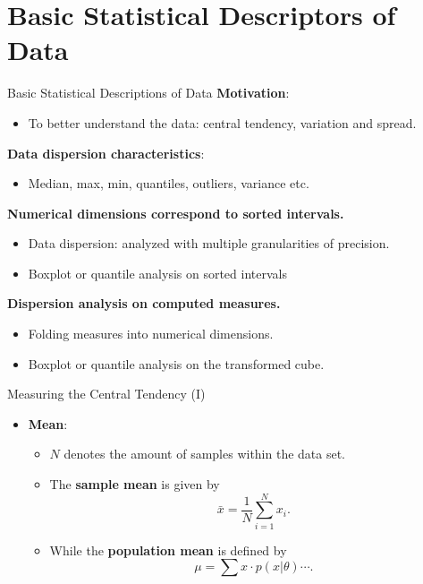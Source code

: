 \section{Basic Statistical Descriptors of Data}

\begin{frame}{Basic Statistical Descriptions of Data}
	\textbf{Motivation}:
	\begin{itemize}
		\item To better understand the data: central tendency, variation and spread.
	\end{itemize}

	\textbf{Data dispersion characteristics}:
	\begin{itemize}
		\item Median, max, min, quantiles, outliers, variance etc.
	\end{itemize}

	\textbf{Numerical dimensions correspond to sorted intervals.}\\
	\begin{itemize}
		\item Data dispersion: analyzed with multiple granularities of precision.
		\item Boxplot or quantile analysis on sorted intervals
	\end{itemize}

	\textbf{Dispersion analysis on computed measures.}\\
	\begin{itemize}
		\item Folding measures into numerical dimensions.
		\item Boxplot or quantile analysis on the transformed cube.
	\end{itemize}
\end{frame}

\begin{frame}{Measuring the Central Tendency (I)}
	\begin{itemize}
		\item \textbf{Mean}:
		      \begin{itemize}
			      \item $N$ denotes the amount of samples within the data set.
			      \item The \textbf{sample mean} is given by\\
			            \begin{equation*}
				            \bar{x} = \frac{1}{N} \sum_{i=1}^{N} x_i.
			            \end{equation*}
			      \item While the \textbf{population mean} is defined by
			            \begin{equation*}
				            \mu = \sum x \cdot p(x | \theta) \cdots.
			            \end{equation*}
		      \end{itemize}
	\end{itemize}
\end{frame}

